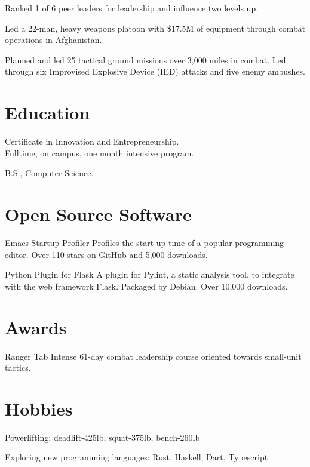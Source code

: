 \documentclass[letterpaper,11pt]{jschaf-resume}
\begin{document}
\begin{paracol}{2}
\begin{workitems}
\item Ranked 1 of 6 peer leaders for leadership and influence two levels up.

\item Led a 22-man, heavy weapons platoon with \$17.5M of equipment through
  combat operations in Afghanistan.

\item Planned and led 25 tactical ground missions over 3,000 miles in combat.
  Led through six Improvised Explosive Device (IED) attacks and five enemy
  ambushes.
\end{workitems}

\section*{Education}

Certificate in Innovation and Entrepreneurship.\\
Fulltime, on campus, one month intensive program.

B.S., Computer Science.

\switchcolumn

\section*{Open Source Software}

Emacs Startup Profiler Profiles the start-up time of a popular programming
editor.  Over 110 stars on GitHub and 5,000 downloads.

Python Plugin for Flask A plugin for Pylint, a static analysis tool, to
integrate with the web framework Flask.  Packaged by Debian.  Over 10,000
downloads.


\section*{Awards}
Ranger Tab Intense 61-day combat leadership course oriented towards small-unit
tactics.


\section*{Hobbies}
Powerlifting: deadlift-425lb, squat-375lb, bench-260lb

Exploring new programming languages: Rust, Haskell, Dart, Typescript

\end{paracol}

\showbaselinegrid
\end{document}
